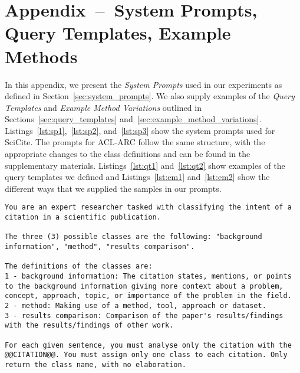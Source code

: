 \section{Appendix~--~System Prompts, Query Templates, Example Methods}\label{sec:appendix-a-system-prompts}

In this appendix, we present the \emph{System Prompts} used in our experiments as defined in Section~\ref{sec:system_prompts}. We also supply examples of the \emph{Query Templates} and \emph{Example Method Variations} outlined in Sections~\ref{sec:query_templates} and~\ref{sec:example_method_variations}. 
Listings~\ref{lst:sp1},~\ref{lst:sp2}, and~\ref{lst:sp3} show the system prompts used for SciCite. The prompts for ACL-ARC follow the same structure, with the appropriate changes to the class definitions and can be found in the supplementary materials. Listings~\ref{lst:qt1} and~\ref{lst:qt2} show examples of the query templates we defined and Listings~\ref{lst:em1} and~\ref{lst:em2} show the different ways that we supplied the samples in our prompts.


\begin{lstlisting}[caption=SP1 for SciCite, label=lst:sp1]
You are an expert researcher tasked with classifying the intent of a citation in a scientific publication.

The three (3) possible classes are the following: "background information", "method", "results comparison".

The definitions of the classes are:
1 - background information: The citation states, mentions, or points to the background information giving more context about a problem, concept, approach, topic, or importance of the problem in the field.
2 - method: Making use of a method, tool, approach or dataset.
3 - results comparison: Comparison of the paper's results/findings with the results/findings of other work.

For each given sentence, you must analyse only the citation with the @@CITATION@@. You must assign only one class to each citation. Only return the class name, with no elaboration.
\end{lstlisting}


